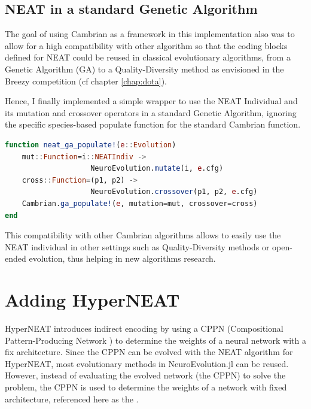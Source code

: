 \subsection{NEAT in a standard Genetic Algorithm}

The goal of using Cambrian as a framework in this implementation also was to allow for a high compatibility with other algorithm so that the coding blocks defined for NEAT could be reused in classical evolutionary algorithms, from a Genetic Algorithm (GA) to a Quality-Diversity method as envisioned in the Breezy competition (cf chapter \ref{chap:dota}). 

Hence, I finally implemented a simple wrapper to use the NEAT Individual and its mutation and crossover operators in a standard Genetic Algorithm, ignoring the specific species-based populate function for the standard Cambrian  function.

\begin{minipage}{\linewidth}
\begin{lstlisting}[language=Julia, caption=Genetic Algorithm populate for NEAT  (\href{https://github.com/TemplierPaul/NeuroEvolution.jl/blob/master/src/evolution.jl}{\color{blue}{Source}})]
function neat_ga_populate!(e::Evolution)
    mut::Function=i::NEATIndiv -> 
                    NeuroEvolution.mutate(i, e.cfg)
    cross::Function=(p1, p2) -> 
                    NeuroEvolution.crossover(p1, p2, e.cfg)
    Cambrian.ga_populate!(e, mutation=mut, crossover=cross)
end
\end{lstlisting}
\end{minipage}

This compatibility with other Cambrian algorithms allows to easily use the NEAT individual in other settings such as Quality-Diversity methods or open-ended evolution, thus helping in new algorithms research.

\section{Adding HyperNEAT}
HyperNEAT \cite{HyperNEAT} introduces indirect encoding by using a CPPN (Compositional Pattern-Producing Network \cite{CPPN}) to determine the weights of a neural network with a fix architecture. Since the CPPN can be evolved with the NEAT algorithm for HyperNEAT, most evolutionary methods in NeuroEvolution.jl can be reused. \\ 
However, instead of evaluating the evolved network (the CPPN) to solve the problem, the CPPN is used to determine the weights of a network with fixed architecture, referenced here as the . 

